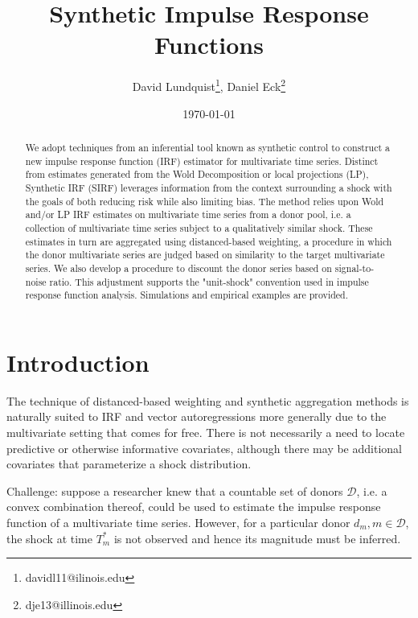 \documentclass[11pt]{article}
\title{Synthetic Impulse Response Functions}
\author{David Lundquist\thanks{davidl11@ilinois.edu}, Daniel Eck\thanks{dje13@illinois.edu} }
\affil{Department of Statistics, University of Illinois at Urbana-Champaign}
\date{\today}
\theoremstyle{definition}
\begin{document}
\maketitle

\begin{abstract}
We adopt techniques from an inferential tool known as synthetic control to construct a new impulse response function (IRF) estimator for multivariate time series.  Distinct from estimates generated from the Wold Decomposition or local projections (LP), Synthetic IRF (SIRF) leverages information from the context surrounding a shock with the goals of both reducing risk while also limiting bias.  The method relies upon Wold and/or LP IRF estimates on multivariate time series from a donor pool, i.e. a collection of multivariate time series subject to a qualitatively similar shock.  These estimates in turn are aggregated using distanced-based weighting, a procedure in which the donor multivariate series are judged based on similarity to the target multivariate series.  We also develop a procedure to discount the donor series based on signal-to-noise ratio.  This adjustment supports the "unit-shock" convention used in impulse response function analysis.  Simulations and empirical examples are provided.

\end{abstract}

\section{Introduction}

The technique of distanced-based weighting and synthetic aggregation methods is naturally suited to IRF and vector autoregressions more generally due to the multivariate setting that comes for free.  There is not necessarily a need to locate predictive or otherwise informative covariates, although there may be additional covariates that parameterize a shock distribution.

Challenge: suppose a researcher knew that a countable set of donors $\mathcal{D}$, i.e. a convex combination thereof, could be used to estimate the impulse response function of a multivariate time series.  However, for a particular donor $d_{m}, m\in \mathcal{D}$, the shock at time $T_{m}^*$ is not observed and hence its magnitude must be inferred.
\end{document}

